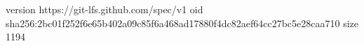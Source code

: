 version https://git-lfs.github.com/spec/v1
oid sha256:2bc01f252f6e65b402a09c85f6a468ad17880f4dc82aef64cc27bc5e28caa710
size 1194
